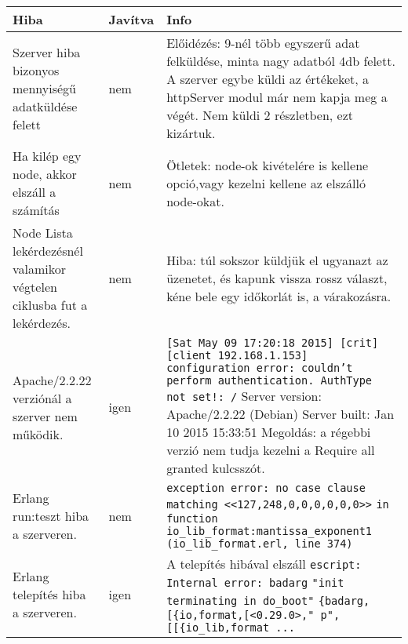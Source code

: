  \begin{center}\begin{tabular}{| p{4cm} | p{1.5cm} | p{8cm} |}
  \hline Hiba & Javítva & Info
  	\\ \hline
    	Szerver hiba bizonyos mennyiségű adatküldése felett 
      &
    	nem
      &  
    	Előidézés: 9-nél több egyszerű adat felküldése, minta nagy adatból 4db felett.
    	A szerver egybe küldi az értékeket, a httpServer modul már nem kapja meg a végét. Nem küldi 2 részletben, ezt kizártuk.
    \\ \hline
        Ha kilép egy node, akkor elszáll a számítás 
      &
      	nem
      &
		Ötletek: node-ok kivételére is kellene opció,vagy kezelni kellene az elszálló node-okat.
    \\ \hline
        Node Lista lekérdezésnél valamikor végtelen ciklusba fut a lekérdezés. 
      &
      	nem
      &
		Hiba: túl sokszor küldjük el ugyanazt az üzenetet, és kapunk vissza rossz választ, kéne bele egy időkorlát is, a várakozásra.
    \\ \hline
      	Apache/2.2.22 verziónál a szerver nem működik. 
      &
      	igen
      &
		\texttt{[Sat May 09 17:20:18 2015] [crit] [client 192.168.1.153] configuration error:  couldn't perform authentication. AuthType not set!: /}\newline
		Server version: Apache/2.2.22 (Debian)
		Server built:   Jan 10 2015 15:33:51\newline 
		Megoldás: a régebbi verzió nem tudja kezelni a Require all granted kulcsszót.
    \\ \hline
    	Erlang run:teszt hiba a szerveren. 
      &
      	nem
      &
		\texttt{exception error: no case clause matching <<127,248,0,0,0,0,0,0>>}
     	\texttt{in function  io\_lib\_format:mantissa\_exponent\/1}
     	\texttt{(io\_lib\_format.erl, line 374) }
    \\ \hline
    	Erlang telepítés hiba a szerveren. 
      &
      	igen
      &
		A telepítés hibával elszáll
		\texttt{escript: Internal error: badarg}
		\texttt{"init terminating in do\_boot"}
        \texttt{\{badarg,[\{io,format,[<0.29.0>,"~p",}
        \texttt{[[\{io\_lib,format ... }


    \\ \hline
  	\end{tabular}
	\end{center}
